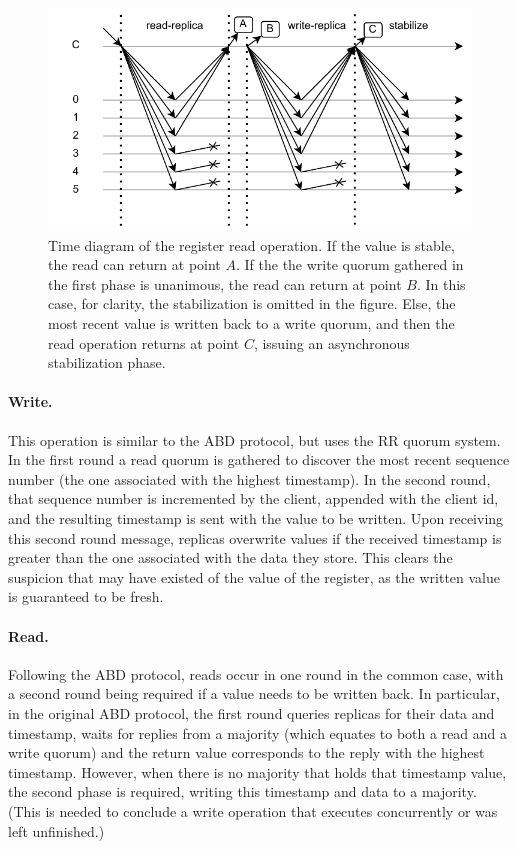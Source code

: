 \begin{figure}[t]
    \centering
    \includegraphics[width=\linewidth]{img/abd_read}
    \caption{Time diagram of the register read operation. If the value is
    stable, the read can return at point $A$. If the the write
    quorum gathered in the first phase is unanimous, the read can
    return at point $B$. In this case, for clarity, the
    stabilization is omitted in the figure. Else, the most recent
    value is written back to a write quorum, and then the read
    operation returns at point $C$, issuing an asynchronous
    stabilization phase.}\label{fig:abd-read-time}
\end{figure}
\paragraph{Write.}  This operation is similar to the ABD
protocol, but uses the \ac{RR} quorum system. In the first round
a read quorum is gathered to discover the most recent sequence number
(the one associated with the highest timestamp).  In the second round,
that sequence number is incremented by the client, appended with the
client id, and the resulting timestamp is sent with the value to be
written. Upon receiving this second round message, replicas overwrite
values if the received timestamp is greater than the one associated
with the data they store. This clears the suspicion that may have
existed of the value of the register, as the written value is
guaranteed to be fresh.


\paragraph{Read.} Following the ABD protocol, reads occur in one
round in the common case, with a second round being required if a
value needs to be written back. In particular, in the original ABD
protocol, the first round queries replicas for their data and
timestamp, waits for replies from a majority (which equates to both a
read and a write quorum) and the return value corresponds to the reply
with the highest timestamp. However, when there is no majority that
holds that timestamp value, the second phase is required, writing this
timestamp and data to a majority. (This is needed to conclude a write
operation that executes concurrently or was left unfinished.)

